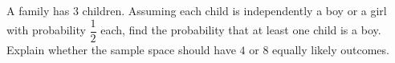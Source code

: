 A family has $3$ children. Assuming each child is independently a boy or a girl with probability $\dfrac{1}{2}$ each, find the probability that at least one child is a boy. Explain whether the sample space should have $4$ or $8$ equally likely outcomes.
